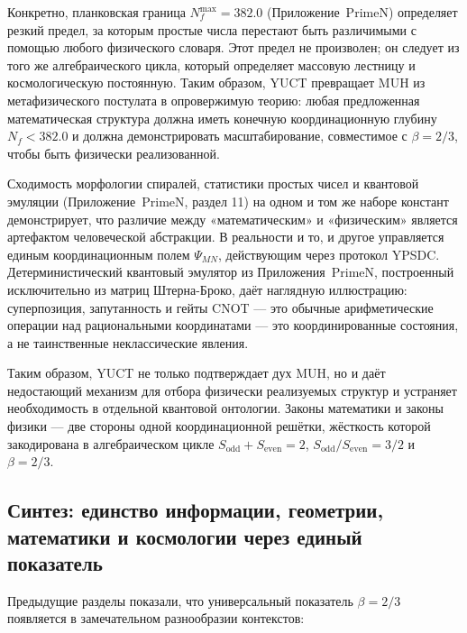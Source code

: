 \documentclass[12pt]{article}
\newcommand{\Sodd}{S_{\mathrm{odd}}}
\newcommand{\Seven}{S_{\mathrm{even}}}
\begin{document}
	Конкретно, планковская граница \(N_f^{\max} = 382.0\) (Приложение~PrimeN) определяет резкий предел, за которым простые числа перестают быть различимыми с помощью любого физического словаря. Этот предел не произволен; он следует из того же алгебраического цикла, который определяет массовую лестницу и космологическую постоянную. Таким образом, YUCT превращает MUH из метафизического постулата в опровержимую теорию: любая предложенная математическая структура должна иметь конечную координационную глубину \(N_f < 382.0\) и должна демонстрировать масштабирование, совместимое с \(\beta = 2/3\), чтобы быть физически реализованной.
	
	Сходимость морфологии спиралей, статистики простых чисел и квантовой эмуляции (Приложение~PrimeN, раздел 11) на одном и том же наборе констант демонстрирует, что различие между «математическим» и «физическим» является артефактом человеческой абстракции. В реальности и то, и другое управляется единым координационным полем \(\Psi_{MN}\), действующим через протокол YPSDC. Детерминистический квантовый эмулятор из Приложения~PrimeN, построенный исключительно из матриц Штерна-Броко, даёт наглядную иллюстрацию: суперпозиция, запутанность и гейты CNOT — это обычные арифметические операции над рациональными координатами — это координированные состояния, а не таинственные неклассические явления.
	
	Таким образом, YUCT не только подтверждает дух MUH, но и даёт недостающий механизм для отбора физически реализуемых структур и устраняет необходимость в отдельной квантовой онтологии. Законы математики и законы физики — две стороны одной координационной решётки, жёсткость которой закодирована в алгебраическом цикле \(\Sodd + \Seven = 2\), \(\Sodd/\Seven = 3/2\) и \(\beta = 2/3\).
	
	\subsection{Синтез: единство информации, геометрии, математики и космологии через единый показатель}
	
	Предыдущие разделы показали, что универсальный показатель \(\beta = 2/3\) появляется в замечательном разнообразии контекстов:
	
\end{document}
